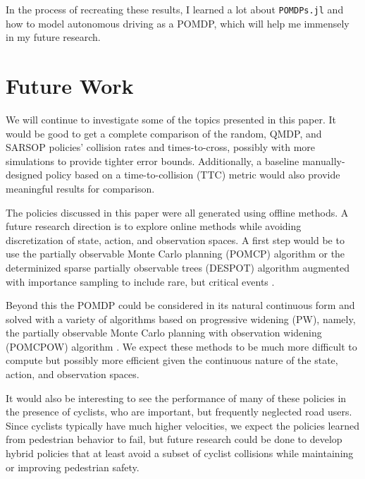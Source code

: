 \documentclass[conference]{IEEEtran}
\begin{document}
In the process of recreating these results, I learned a lot about \texttt{POMDPs.jl} and how to model autonomous driving as a POMDP, which will help me immensely in my future research.

\section{Future Work}
\label{sec:future-work}

We will continue to investigate some of the topics presented in this paper. It would be good to get a complete comparison of the random, QMDP, and SARSOP policies' collision rates and times-to-cross, possibly with more simulations to provide tighter error bounds. Additionally, a baseline manually-designed policy based on a time-to-collision (TTC) metric would also provide meaningful results for comparison.

The policies discussed in this paper were all generated using offline methods. A future research direction is to explore online methods while avoiding discretization of state, action, and observation spaces. A first step would be to use the partially observable Monte Carlo planning (POMCP) algorithm \cite{Silver2010Monte-CarloPOMDPs} or the determinized sparse partially observable trees (DESPOT) algorithm augmented with importance sampling to include rare, but critical events \cite{Ye2017DESPOT:Regularization, Luo2019ImportanceUncertainty}. 

Beyond this the POMDP could be considered in its natural continuous form and solved with a variety of algorithms based on progressive widening (PW), namely, the partially observable Monte Carlo planning with observation widening (POMCPOW) algorithm \cite{Sunberg2018OnlineSpaces}. We expect these methods to be much more difficult to compute but possibly more efficient given the continuous nature of the state, action, and observation spaces.

It would also be interesting to see the performance of many of these policies in the presence of cyclists, who are important, but frequently neglected road users. Since cyclists typically have much higher velocities, we expect the policies learned from pedestrian behavior to fail, but future research could be done to develop hybrid policies that at least avoid a subset of cyclist collisions while maintaining or improving pedestrian safety.



\end{document}
